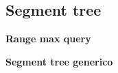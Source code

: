 \subsection{Segment tree}
    \textbf{Range max query}
    

    \textbf{Segment tree generico}
    